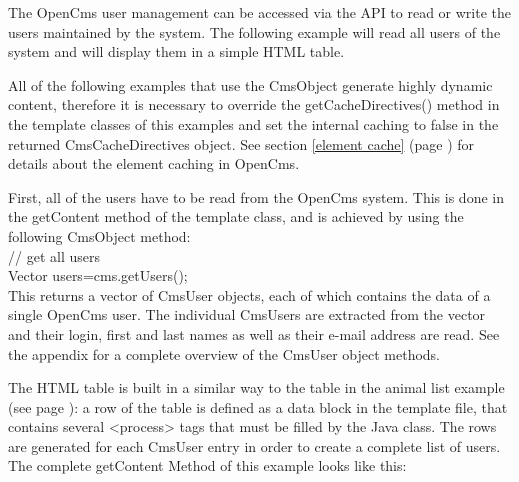 The OpenCms user management can be accessed via the API to read or
write the users maintained by the system. The following example will
read all users of the system and will display them in a simple HTML
table. 

All of the following examples that use the CmsObject generate highly dynamic
content, therefore it is necessary to override the {\meth getCacheDirectives()} 
method in the template classes of this examples and set the internal caching
to false in the returned {\class CmsCacheDirectives} 
object. See section \ref{element cache} (page \pageref{element cache})
for details about the element caching in OpenCms.

First, all of the users have to be read from the OpenCms system. This
is done in the {\meth getContent} method of the template class, and is achieved
by using the following {\meth CmsObject} method:\\


{\meth // get all users\\

Vector users=cms.getUsers();}\\

This returns a vector of {\name CmsUser} objects, each of which contains the
data of a single OpenCms user. The individual {\name CmsUsers} are extracted from the
vector and their login, first and last names as well as their e-mail
address are read. See the appendix for a complete overview of the
{\name CmsUser} object methods.

The HTML table is built in a similar way to the table in the animal
list example (see page \pageref{animal list example}): 
a row of the table is defined as a data block in the
template file, that contains several {\tag <process>} tags that must be
filled by the Java class. The rows are generated for each {\name CmsUser}
entry in order to create a complete list of users.\\

The complete getContent Method of this example looks like this:\\

